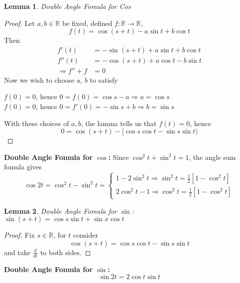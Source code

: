 \documentclass[12pt]{article}
\theoremstyle{plain}
\newtheorem{lemma}{Lemma}[subsection]
\newcommand{\mR}{{\mathbb{R}}}
\begin{document}
	\begin{lemma}
		Double Angle Fomula for Cos
	\end{lemma}
	\begin{proof}
		Let $a, b \in \mR$ be fixed, defined $f : \mR \to \mR$, 
		\[
			f(t) = \cos(s+t) - a \sin t + b\cos t
		\]
		Then
		\begin{align*}
			f'(t) & = - \sin (s+t) + a\sin t + b \cos t\\
			f''(t) &= -\cos (s+t) + a\cos t -b\sin t\\
			\Rightarrow f''+f &= 0
		\end{align*}
		Now we wish to choose $a$, $b$ to satisfy
		
		$f(0)=0$, hence $0=f(0)=\cos s - a \Rightarrow a = \cos s$\\
		$f(0)=0$, hence $0=f'(0)=-\sin s + b \Rightarrow b = \sin s$

		With these choices of $a,b$, the lamma tells us that $f(t) = 0$, hence
		\[
			0 = \cos(s+t) - [\cos s \cos t-\sin s \sin t)
		\]
	\end{proof}

	\textbf{Double Angle Fomula for $\cos$: }
	Since $\cos^2 t + \sin^2 t = 1$, the angle sum fomula gives
	\[
		\cos 2t = \cos^2 t - \sin^2 t = 
		\begin{cases}
			1 - 2\sin^2 t \Rightarrow\sin^2 t = \frac12[1-\cos^2 t]\\
			2\cos^2 t - 1 \Rightarrow \cos^2 t = \frac12 [1-\cos^2 t]
		\end{cases}
	\]
	
	\begin{lemma}
		Double Angle Fomula for $\sin$: $\sin(s+t) = \cos s \sin t + \sin x
		\cos t$
	\end{lemma}
	\begin{proof}
		Fix $s \in \mR$, for $t$ consider
		\[
			\cos (s + t) = \cos s \cos t - \sin s \sin t
		\]
		and take $\frac d{dt}$ to both sides.
	\end{proof}

	\textbf{Double Angle Fomula for $\sin$: }
	\[
		\sin 2t = 2\cos t \sin t
	\]
\end{document}
